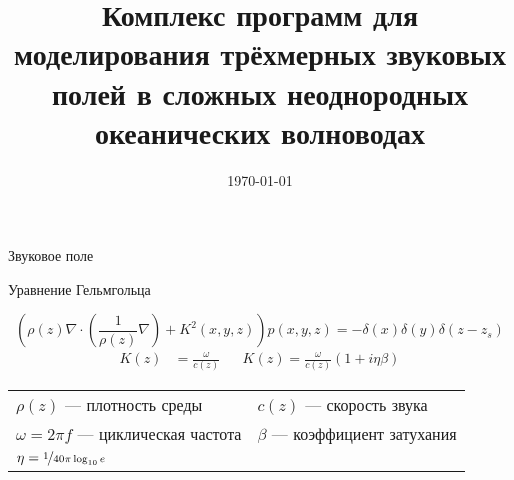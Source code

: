 \documentclass[10pt, unicode]{beamer}
\title[Моделирование звукового поля]{Комплекс программ для моделирования трёхмерных звуковых полей в сложных неоднородных океанических волноводах}
\author[Тыщенко А.Г.]{
    \vbox{\raggedright%
        Студент группы М9119-09.04.01иибд\\ 
        Тыщенко Андрей Геннадьевич%
    }
    \vskip 20pt%
    \indent\vbox{\raggedright%
        Руководитель:\\
        кандидат физико-математических наук,\\
        зав. лаб. 3/2 ТОИ ДВО РАН
        Петров Павел Сергеевич\ifmetropolis\else\vskip -0.5cm\fi%
    }
}
\date{\today}
\newif\ifmetropolis
\newcommand{\pa}[1]{\left(#1\right)}
\begin{document}
    
    \frame{\thispagestyle{empty}\titlepage}
    
    \begin{frame}[fragile]{Звуковое поле}
        \begin{block}{Уравнение Гельмгольца}
            \ifmetropolis
                \smallskip
            \fi
            \begin{equation}\label{eq::3DH}
                \pa{\rho\pa{z}\nabla\cdot\pa{\frac{1}{\rho\pa{z}}\nabla} +  K^2\pa{x,y,z}}p\pa{x,y,z}=-\delta\pa{x}\delta\pa{y}\delta\pa{z-z_s}
            \end{equation}
            \begin{align*}
                K\pa{z}&=\frac{\omega}{c\pa{z}}&&K\pa{z}=\frac{\omega}{c\pa{z}}\pa{1+i\eta\beta}
            \end{align*}
            \centering
            \begin{tabular}{ll}
                 $\rho\pa{z}$ --- плотность среды & $c\pa{z}$ --- скорость звука\\
                 $\omega=2\pi f$ --- циклическая частота & $\beta$ --- коэффициент затухания\\
                 $\eta=\nicefrac{1}{40\pi\log_{10}e}$&
            \end{tabular}
        \end{block}
    \end{frame}
\end{document}
